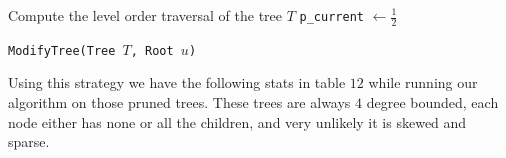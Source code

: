 \documentclass{article}
\theoremstyle{remark}
\begin{document}
\begin{algorithm}[H]\label{alg:2}
    \SetAlgoLined

    Compute the level order traversal of the tree $T$\;
    \texttt{p\_current} $\gets \frac{1}{2}$\;
    
    \caption{\texttt{ModifyTree(Tree $T$, Root $u$)}}
\end{algorithm}

Using this strategy we have the following stats in table $12$ while running our algorithm on those pruned trees. These trees are always $4$ degree bounded, each node either has none or all the children, and very unlikely it is skewed and sparse.
\end{document}
